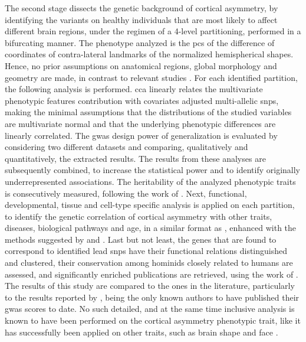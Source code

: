 The second stage dissects the genetic background of cortical asymmetry, by identifying the variants on healthy individuals that are most likely to affect different brain regions, under the regimen of a 4-level partitioning, performed in a bifurcating manner. The phenotype analyzed is the \acp{pc} of the difference of coordinates of contra-lateral landmarks of the normalized hemispherical shapes. Hence, no prior assumptions on anatomical regions, global morphology and geometry are made, in contrast to relevant studies \cite{Kong2022,Zhao2022}. For each identified partition, the following analysis is performed. \Ac{cca} linearly relates the multivariate phenotypic features contribution with covariates adjusted multi-allelic \acp{snp}, making the minimal assumptions that the distributions of the studied variables are multivariate normal and that the underlying phenotypic differences are linearly correlated. The \ac{gwas} design power of generalization is evaluated by considering two different datasets and comparing, qualitatively and quantitatively, the extracted results. The results from these analyses are subsequently combined, to increase the statistical power and to identify originally underrepresented associations. The heritability of the analyzed phenotypic traits is consecutively measured, following the work of \citet{Bulik-Sullivan2015}. Next, functional, developmental, tissue and cell-type specific analysis is applied on each partition, to identify the genetic correlation of cortical asymmetry with other traits, diseases, biological pathways and age, in a similar format as \citet{Sha2021}, enhanced with the methods suggested by \citet{McLean2010} and \citet{Finucane2018}. Last but not least, the genes that are found to correspond to identified lead \acp{snp} have their functional relations distinguished and clustered, their conservation among hominids closely related to humans are assessed, and significantly enriched publications are retrieved, using the work of \citet{Szklarczyk2021}. The results of this study are compared to the ones in the literature, particularly to the results reported by \citet{Sha2021}, being the only known authors to have published their \ac{gwas} scores to date. No such detailed, and at the same time inclusive analysis is known to have been performed on the cortical asymmetry phenotypic trait, like it has successfully been applied on other traits, such as brain shape \cite{Naqvi2021} and face \cite{Claes2018}.
